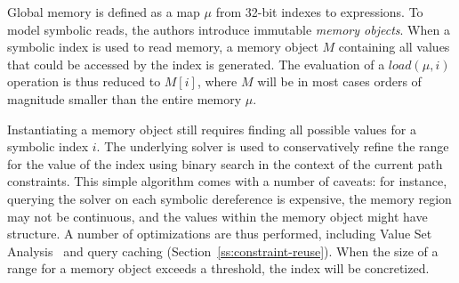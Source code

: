 Global memory is defined as a map $\mu$ from 32-bit indexes to expressions. To model symbolic reads, the authors introduce immutable {\em memory objects}. When a symbolic index is used to read memory, a memory object $M$ containing all values that could be accessed by the index is generated. The evaluation of a $load(\mu,i)$ operation is thus reduced to $M[i]$, where $M$ will be in most cases orders of magnitude smaller than the entire memory $\mu$.

Instantiating a memory object still requires finding all possible values for a symbolic index $i$. The underlying solver is used to conservatively refine the range for the value of the index using binary search in the context of the current path constraints. This simple algorithm comes with a number of caveats: for instance, querying the solver on each symbolic dereference is expensive, the memory region may not be continuous, and the values within the memory object might have structure. A number of optimizations are thus performed, including Value Set Analysis~\cite{VSA-CC04} and query caching (Section~\ref{ss:constraint-reuse}). When the size of a range for a memory object exceeds a threshold, the index will be concretized. %

